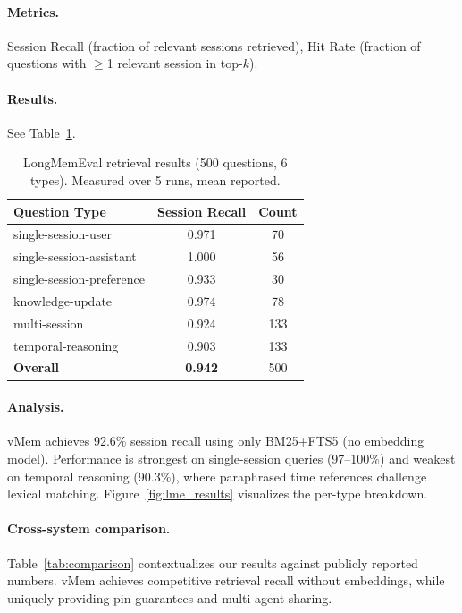 \documentclass[10pt,twocolumn]{article}
\begin{document}
\paragraph{Metrics.} Session Recall (fraction of relevant sessions retrieved), Hit Rate (fraction of questions with $\geq$1 relevant session in top-$k$).

\paragraph{Results.} See Table~\ref{tab:longmemeval}.

\begin{table}[t]
\centering
\caption{LongMemEval retrieval results (500 questions, 6 types). Measured over 5 runs, mean reported.}
\label{tab:longmemeval}
\small
\begin{tabular}{lcc}
\toprule
Question Type & Session Recall & Count \\
\midrule
single-session-user       & 0.971 & 70 \\
single-session-assistant  & 1.000 & 56 \\
single-session-preference & 0.933 & 30 \\
knowledge-update          & 0.974 & 78 \\
multi-session             & 0.924 & 133 \\
temporal-reasoning        & 0.903 & 133 \\
\midrule
\textbf{Overall}          & \textbf{0.942} & 500 \\
\bottomrule
\end{tabular}
\end{table}

\paragraph{Analysis.} vMem achieves 92.6\% session recall using only BM25+FTS5 (no embedding model). Performance is strongest on single-session queries (97--100\%) and weakest on temporal reasoning (90.3\%), where paraphrased time references challenge lexical matching. Figure~\ref{fig:lme_results} visualizes the per-type breakdown.

\paragraph{Cross-system comparison.} Table~\ref{tab:comparison} contextualizes our results against publicly reported numbers. vMem achieves competitive retrieval recall without embeddings, while uniquely providing pin guarantees and multi-agent sharing.
\end{document}
